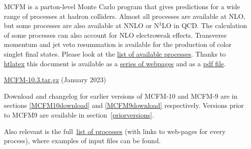 \label{overview}

MCFM is a parton-level Monte Carlo program that gives predictions for a wide range of 
processes at hadron colliders. Almost all processes are available at NLO,
but some processes are also available at NNLO or N$^3$LO in QCD.
The calculation of some
processes can also account for NLO electroweak effects.
Transverse momentum and jet veto resummation is available for the 
production of color singlet final states.
 Please look at the {\href{\mcfmprocs/proclist.html}{list of available processes}}. 
Thanks to \href{https://tug.org/tex4ht/}{htlatex}
this document is available as a {\href{\mcfmweb}{series of webpages}} and as a {\href{\mcfmpdf}{pdf file}}.

\href{https://mcfm.fnal.gov/downloads/MCFM-10.3.tar.gz}{MCFM-10.3.tar.gz} (January 2023)

Download and changelog for earlier versions of MCFM-10 and MCFM-9 are
in sections \ref{MCFM10download} and \ref{MCFM9download} respectively.
Versions prior to MCFM9 are available in section~\ref{priorversions}.

Also relevant is the full~\href{\mcfmprocs/proclist.html}{list of processes} (with links to web-pages
for every process), where examples of input files can be found.




